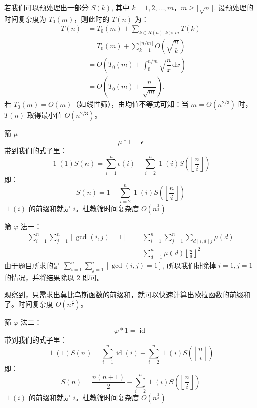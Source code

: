 \documentclass[UTF8]{beamer}
\begin{document}
\begin{frame}
若我们可以预处理出一部分 $S(k)$, 其中 $k=1,2,\dots,m$，$m\geq \lfloor\sqrt n\rfloor$. 设预处理的时间复杂度为 $T_0(m)$，则此时的 $T(n)$ 为：
$$
\begin{aligned}
    T(n) & = T_0(m)+\sum_{k\in R(n);k>m} T(k)\\
         & = T_0(m)+\sum_{k=1}^{\lfloor n/m \rfloor} O\left(\sqrt{\dfrac{n}{k}}\right)\\
         & = O\left(T_0(m)+\int_{0}^{n/m} \sqrt{\dfrac{n}{x}} \mathrm{d}x\right)\\
         & = O\left(T_0(m)+\dfrac{n}{\sqrt m}\right).
\end{aligned}
$$
若 $T_0(m)=O(m)$（如线性筛），由均值不等式可知：当 $m=\Theta\left(n^{2/3}\right)$ 时，$T(n)$ 取得最小值 $O\left(n^{2/3}\right)$。
\end{frame}
\begin{frame}{筛 $\mu$}
    $$
    \mu \ast 1=\epsilon
    $$
    带到我们的式子里：
    $$
    \operatorname{1}(1)S(n)=\sum_{i=1}^n\epsilon(i)-\sum_{i=2}^n\operatorname{1}(i)S\left(\left\lfloor\frac{n}{i}\right\rfloor\right)
    $$
    即：
    $$
    S(n)=1-\sum_{i=2}^n\operatorname{1}(i)S\left(\left\lfloor\frac{n}{i}\right\rfloor\right)
    $$
    $\operatorname{1}(i)$ 的前缀和就是 $i$。杜教筛时间复杂度 $O(n^{\frac{2}{3}})$
\end{frame}
\begin{frame}{筛 $\varphi$}
    法一：
 $$
\begin{aligned}
    \sum_{i=1}^n \sum_{j=1}^n [\gcd(i,j)=1] & =\sum_{i=1}^n \sum_{j=1}^n \sum_{d \mid i,d \mid j} \mu(d)    \\
                                            & =\sum_{d=1}^n \mu(d) {\left\lfloor \frac n d \right\rfloor}^2
\end{aligned}
$$
由于题目所求的是 
$\sum_{i=1}^n \sum_{j=1}^i [\gcd(i,j)=1]$, 所以我们排除掉 $i=1,j=1$ 的情况，并将结果除以 $2$ 即可。

观察到，只需求出莫比乌斯函数的前缀和，就可以快速计算出欧拉函数的前缀和了。时间复杂度  $O(n^{\frac 2 3})$。
\end{frame}
\begin{frame}{筛 $\varphi$}
    法二：
    $$
    \varphi \ast 1=\operatorname{id}
    $$
    带到我们的式子里：
    $$
    \operatorname{1}(1)S(n)=\sum_{i=1}^n\operatorname{id}(i)-\sum_{i=2}^n\operatorname{1}(i)S\left(\left\lfloor\frac{n}{i}\right\rfloor\right)
    $$
    即：
    $$
    S(n)=\frac{n(n+1)}{2}-\sum_{i=2}^n\operatorname{1}(i)S\left(\left\lfloor\frac{n}{i}\right\rfloor\right)
    $$
    $\operatorname{1}(i)$ 的前缀和就是 $i$。杜教筛时间复杂度 $O(n^{\frac{2}{3}})$

\end{frame}
\end{document}
